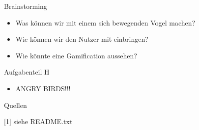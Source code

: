 \documentclass{beamer}
\begin{document}
\begin{frame}{Brainstorming}
\begin{itemize}
\item Was können wir mit einem sich bewegenden Vogel machen?
\item Wie können wir den Nutzer mit einbringen?
\item Wie könnte eine Gamification aussehen?
\end{itemize}
\end{frame}

\begin{frame}{Aufgabenteil H}
\begin{itemize}
\item ANGRY BIRDS!!!
\end{itemize}
\begin{figure}
    \centering
\end{figure}
\end{frame}



\begin{frame}{Quellen}
	\begin{thebibliography}{1}
[1]{ siehe README.txt}
\end{thebibliography}
\end{frame}


	
    	
    	
    	
\end{document}
